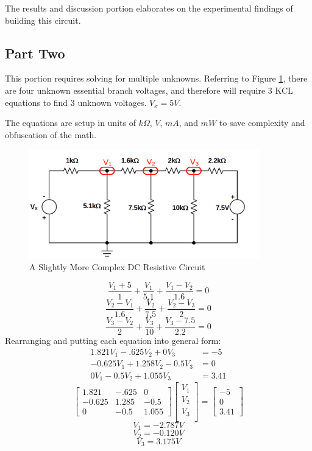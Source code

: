 \documentclass[12pt]{article}
\begin{document}
The results and discussion portion elaborates on the experimental findings of
building this circuit.
\subsection*{Part Two}
This portion requires solving for multiple unknowns. Referring to Figure
\ref{fig:circuit2}, there are four unknown essential branch voltages, and
therefore will require 3 KCL equations to find 3 unknown voltages. $V_x = 5V$.

The equations are setup in units of $k\Omega$, $V$, $mA$, and $mW$ to save
complexity and obfuscation of the math.
\begin{figure}[H]
	\centering
	\includegraphics[width=10cm]{06_02}
	\caption{A Slightly More Complex DC Resistive Circuit}
	\label{fig:circuit2}
\end{figure}
\[
	\frac{V_1 + 5}{1} + \frac{V_1}{5.1} + \frac{V_1 - V_2}{1.6} = 0
\]
\[
	\frac{V_2 - V_1}{1.6} + \frac{V_2}{7.5} + \frac{V_2 - V_3}{2} = 0
\]
\[
	\frac{V_3 - V_2}{2} + \frac{V_3}{10} + \frac{V_3 - 7.5}{2.2} = 0
\]
Rearranging and putting each equation into general form:
\begin{align*}
	1.821V_1 - .625V_2 + 0V_3     & = -5   \\
	-0.625V_1 + 1.258V_2 - 0.5V_3 & = 0    \\
	0V_1 - 0.5V_2 +1.055V_3       & = 3.41
\end{align*}
\[
	\begin{bmatrix}
		1.821  & -.625 & 0     \\
		-0.625 & 1.285 & -0.5  \\
		0      & -0.5  & 1.055
	\end{bmatrix}
	\begin{bmatrix}
		V_1 \\
		V_2 \\
		V_3 \\
	\end{bmatrix}
	=
	\begin{bmatrix}
		-5 \\
		0  \\
		3.41
	\end{bmatrix}
\]
\[
	V_1 = -2.787V
\]
\[
	V_2 = -0.120V
\]
\[
	V_3 = 3.175V
\]
\end{document}
